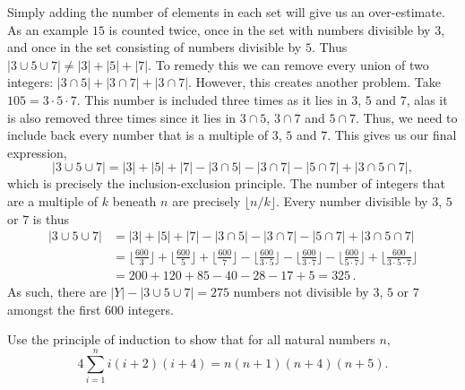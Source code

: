 \documentclass[a4paper, english, 12pt]{article} %
\begin{document}
\begin{answer}
  Simply adding the number of elements in each set will give us an
  over-estimate. As an example $15$ is counted twice, once in the set with
  numbers divisible by 3, and once in the set consisting of numbers divisible by
  $5$. Thus $|3 \cup 5 \cup 7| \neq |3| + |5|+|7|$. To remedy this we can remove
  every union of two integers: $|3 \cap 5| + |3 \cap 7| + |3 \cap 7|$. However,
  this creates another problem. Take $105 = 3 \cdot 5 \cdot 7$. This number is
  included three times as it lies in $3$, $5$ and $7$, alas it is also removed
  three times since it lies in $3 \cap 5$, $3 \cap 7$ and $5 \cap 7$. Thus, we
  need to include back every number that is a multiple of $3$, $5$ and $7$. This
  gives us our final expression,
  \begin{equation*}
    |3 \cup 5 \cup 7| = |3| + |5| + |7| - |3 \cap 5| - |3 \cap 7| - |5 \cap 7| + |3 \cap 5 \cap 7|,
  \end{equation*}
  which is precisely the inclusion-exclusion principle.
  The number of integers that are a multiple of $k$ beneath $n$ are precisely
  $\lfloor {n/k} \rfloor$. Every number divisible by $3$, $5$ or $7$ is thus
  \begin{align*}
        |3 \cup 5 \cup 7|
    & = |3| + |5| + |7| - |3 \cap 5| - |3 \cap 7| - |5 \cap 7| + |3 \cap 5 \cap 7| \\
    & = \lfloor \frac{600}{3} \rfloor
    +   \lfloor \frac{600}{5}  \rfloor
    +  \lfloor \frac{600}{7}  \rfloor  
    -  \lfloor \frac{600}{3\cdot 5}  \rfloor
    -  \lfloor \frac{600}{3\cdot 7}  \rfloor 
    -  \lfloor \frac{600}{5 \cdot 7}  \rfloor
      +  \lfloor \frac{600}{3\cdot 5\cdot 7} \rfloor  \\
    & = 200 + 120 + 85 - 40 - 28 - 17 + 5 
      = 325\,.
  \end{align*}
  As such, there are $|Y| - |3 \cup 5 \cup 7| = 275$ numbers not divisible by $3$,
  $5$ or $7$ amongst the first $600$ integers.
\end{answer}

\begin{problem}
  Use the principle of induction to show that for all natural numbers $n$,
  \begin{equation*}
    4 \sum_{i=1}^n i(i+2)(i+4) = n(n+1)(n+4)(n+5).
  \end{equation*}
\end{problem}
\end{document}
